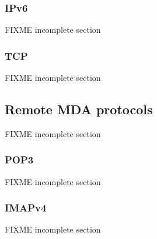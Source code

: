 \subsubsection{IPv6}
\cite{RFC2460}
FIXME incomplete section

\subsubsection{TCP}
FIXME incomplete section

\subsection{Remote MDA protocols}
FIXME incomplete section

\subsubsection{POP3}
\cite{RFC1939}
FIXME incomplete section

\subsubsection{IMAPv4}
\cite{RFC3501}
FIXME incomplete section

